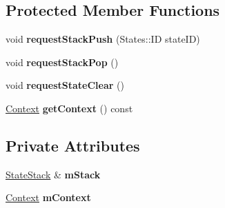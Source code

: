 \subsection*{\-Protected \-Member \-Functions}
\begin{DoxyCompactItemize}
\item 
\hypertarget{classState_a6763de833ceb9c23df45aff163a4a1cd_a6763de833ceb9c23df45aff163a4a1cd}{void {\bfseries request\-Stack\-Push} (\-States\-::\-I\-D state\-I\-D)}\label{classState_a6763de833ceb9c23df45aff163a4a1cd_a6763de833ceb9c23df45aff163a4a1cd}

\item 
\hypertarget{classState_aa418660892d6161772c907bd8d70f910_aa418660892d6161772c907bd8d70f910}{void {\bfseries request\-Stack\-Pop} ()}\label{classState_aa418660892d6161772c907bd8d70f910_aa418660892d6161772c907bd8d70f910}

\item 
\hypertarget{classState_a4b602bed9bf0179ee5f6748fce340ae6_a4b602bed9bf0179ee5f6748fce340ae6}{void {\bfseries request\-State\-Clear} ()}\label{classState_a4b602bed9bf0179ee5f6748fce340ae6_a4b602bed9bf0179ee5f6748fce340ae6}

\item 
\hypertarget{classState_aec041e226f59f134902ca8671c02788c_aec041e226f59f134902ca8671c02788c}{\hyperlink{classContext}{\-Context} {\bfseries get\-Context} () const }\label{classState_aec041e226f59f134902ca8671c02788c_aec041e226f59f134902ca8671c02788c}

\end{DoxyCompactItemize}
\subsection*{\-Private \-Attributes}
\begin{DoxyCompactItemize}
\item 
\hypertarget{classState_ab7ae9bb2e54a4325acb013c1a51b7b0c_ab7ae9bb2e54a4325acb013c1a51b7b0c}{\hyperlink{classStateStack}{\-State\-Stack} \& {\bfseries m\-Stack}}\label{classState_ab7ae9bb2e54a4325acb013c1a51b7b0c_ab7ae9bb2e54a4325acb013c1a51b7b0c}

\item 
\hypertarget{classState_a7a3d9f2d67529dd7c2eaae143447511b_a7a3d9f2d67529dd7c2eaae143447511b}{\hyperlink{classContext}{\-Context} {\bfseries m\-Context}}\label{classState_a7a3d9f2d67529dd7c2eaae143447511b_a7a3d9f2d67529dd7c2eaae143447511b}

\end{DoxyCompactItemize}


